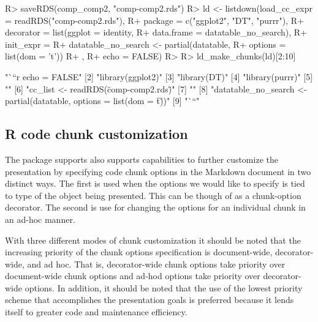 \documentclass[
]{jss}
\begin{document}
\begin{CodeChunk}

\begin{CodeInput}
R> saveRDS(comp_comp2, "comp-comp2.rds")
R> ld <- listdown(load_cc_expr = readRDS("comp-comp2.rds"),
R+                package = c("ggplot2", "DT", "purrr"),
R+                decorator = list(ggplot = identity,
R+                                 data.frame = datatable_no_search),
R+                init_expr = {
R+                  datatable_no_search <- partial(datatable,
R+                                                 options = list(dom = 't'))
R+                  },
R+                echo = FALSE)
R> 
R> ld_make_chunks(ld)[2:10]
\end{CodeInput}

\begin{CodeOutput}
[1] "```{r echo = FALSE}"                                                   
[2] "library(ggplot2)"                                                      
[3] "library(DT)"                                                           
[4] "library(purrr)"                                                        
[5] ""                                                                      
[6] "cc_list <- readRDS(\"comp-comp2.rds\")"                                
[7] ""                                                                      
[8] "datatable_no_search <- partial(datatable, options = list(dom = \"t\"))"
[9] "```"                                                                   
\end{CodeOutput}
\end{CodeChunk}

\hypertarget{r-code-chunk-customization}{%
\subsection{R code chunk
customization}\label{r-code-chunk-customization}}

The  package supports also supports capabilities to
further customize the presentation by specifying  code chunk
options in the  Markdown document in two distinct ways. The
first is used when the options we would like to specify is tied to type
of the object being presented. This can be though of as a chunk-option
decorator. The second is use for changing the options for an individual
chunk in an ad-hoc manner.

With three different modes of chunk customization it should be noted
that the increasing priority of the chunk options specification is
document-wide, decorator-wide, and ad hoc. That is, decorator-wide chunk
options take priority over document-wide chunk options and ad-hod
options take priority over decorator-wide options. In addition, it
should be noted that the use of the lowest priority scheme that
accomplishes the presentation goals is preferred because it lends itself
to greater code and maintenance efficiency.
\end{document}
